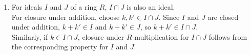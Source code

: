 \documentclass[13pt]{article}
\begin{document}
\begin{enumerate}
\item For ideals $I$ and $J$ of a ring $R$, $I\cap J$ is also an ideal.\\
For closure under addition, choose $k,k'\in I\cap J$. Since $I$ and $J$ are
closed under addition, $k+k' \in I$ and $k+k'\in J$, so $k+k'\in I\cap J$.\\
Similarly, if $k\in I\cap J$, closure under $R$-multiplication for $I\cap J$
follows from the corresponding property for $I$ and $J$. 

\end{enumerate}
\end{document}
